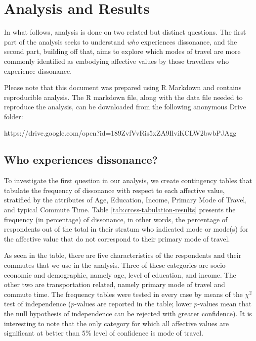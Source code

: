 \documentclass[]{elsarticle} %
\begin{document}
\hypertarget{analysis-and-results}{%
\section{Analysis and Results}\label{analysis-and-results}}

In what follows, analysis is done on two related but distinct questions.
The first part of the analysis seeks to understand \emph{who}
experiences dissonance, and the second part, building off that, aims to
explore which modes of travel are more commonly identified as embodying
affective values by those travellers who experience dissonance.

Please note that this document was prepared using R Markdown and
contains reproducible analysis. The R markdown file, along with the data
file needed to reproduce the analysis, can be downloaded from the
following anonymous Drive folder:

https://drive.google.com/open?id=189ZvfVvRis5xZA9IlviKCLW2bwbPJAgg

\hypertarget{who-experiences-dissonance}{%
\subsection{Who experiences
dissonance?}\label{who-experiences-dissonance}}

To investigate the first question in our analysis, we create contingency
tables that tabulate the frequency of dissonance with respect to each
affective value, stratified by the attributes of Age, Education, Income,
Primary Mode of Travel, and typical Commute Time. Table
\ref{tab:cross-tabulation-results} presents the frequency (in
percentage) of dissonance, in other words, the percentage of respondents
out of the total in their stratum who indicated mode or mode(s) for the
affective value that do not correspond to their primary mode of travel.

As seen in the table, there are five characteristics of the respondents
and their commutes that we use in the analysis. Three of these
categories are socio-economic and demographic, namely age, level of
education, and income. The other two are transportation related, namely
primary mode of travel and commute time. The frequency tables were
tested in every case by means of the \(\chi^2\) test of independence
(\(p\)-values are reported in the table; lower \(p\)-values mean that
the null hypothesis of independence can be rejected with greater
confidence). It is interesting to note that the only category for which
all affective values are significant at better than 5\% level of
confidence is mode of travel.
\end{document}

